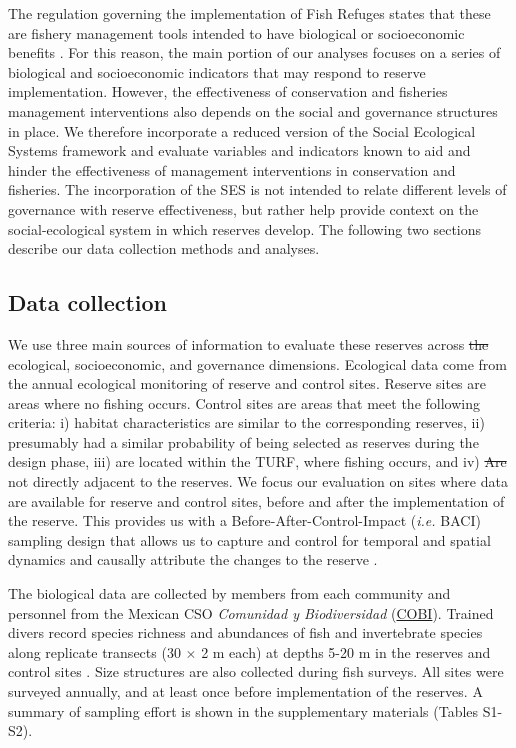 \documentclass{frontiersSCNS}
\providecommand{\DIFaddtex}[1]{{\protect\color{blue}\uwave{#1}}} %
\providecommand{\DIFdeltex}[1]{{\protect\color{red}\sout{#1}}}                      %
\providecommand{\DIFaddbegin}{} %
\providecommand{\DIFaddend}{} %
\providecommand{\DIFdelbegin}{} %
\providecommand{\DIFdelend}{} %
\providecommand{\DIFadd}[1]{\texorpdfstring{\DIFaddtex{#1}}{#1}} %
\providecommand{\DIFdel}[1]{\texorpdfstring{\DIFdeltex{#1}}{}} %
\begin{document}
The regulation governing the implementation of Fish Refuges states that
these are fishery management tools intended to have biological or
socioeconomic benefits \citep{nom}. For this reason, the main portion of
our analyses focuses on a series of biological and socioeconomic
indicators that may respond to reserve implementation. However, the
effectiveness of conservation and fisheries management interventions
also depends on the social and governance structures in place. We
therefore incorporate a reduced version of the Social Ecological Systems
framework \citep{ostrom_2009} and evaluate variables and indicators
known to aid and hinder the effectiveness of management interventions in
conservation and fisheries. The incorporation of the SES is not intended
to relate different levels of governance with reserve effectiveness, but
rather help provide context on the social-ecological system in which
reserves develop. The following two sections describe our data
collection methods and analyses.

\hypertarget{data-collection}{%
\subsection{Data collection}\label{data-collection}}

We use three main sources of information to evaluate these reserves
across \DIFdelbegin \DIFdel{the }\DIFdelend ecological, socioeconomic, and governance dimensions. Ecological
data come from the annual ecological monitoring of reserve and control
sites. Reserve sites are areas where no fishing occurs. Control sites
are areas that meet the following criteria: i) habitat characteristics
are similar to the corresponding reserves, ii) presumably had a similar
probability of being selected as reserves during the design phase, iii)
are located within the TURF, where fishing occurs, and iv) \DIFdelbegin \DIFdel{Are }\DIFdelend \DIFaddbegin \DIFadd{are }\DIFaddend not
directly adjacent to the reserves. We focus our evaluation on sites
where data are available for reserve and control sites, before and after
the implementation of the reserve. This provides us with a
Before-After-Control-Impact (\emph{i.e.} BACI) sampling design that
allows us to capture and control for temporal and spatial dynamics
\citep{stewartoaten_1986,depalma_2018} and causally attribute the
changes to the reserve
\citep{francinifilho_2008,Villasenor-Derbez_2018}.

The biological data are collected by members from each community and
personnel from the Mexican CSO \emph{Comunidad y Biodiversidad}
(\href{www.cobi.org.mx}{COBI}). Trained divers record species richness
and abundances of fish and invertebrate species along replicate
transects (30 \(\times\) 2 m each) at depths 5-20 m in the reserves and
control sites \citep{suman_2010-ez,fulton_2018,fulton_2019}. Size
structures are also collected during fish surveys. All sites were
surveyed annually, and at least once before implementation of the
reserves. A summary of sampling effort is shown in the supplementary
materials (Tables S1-S2).
\end{document}
